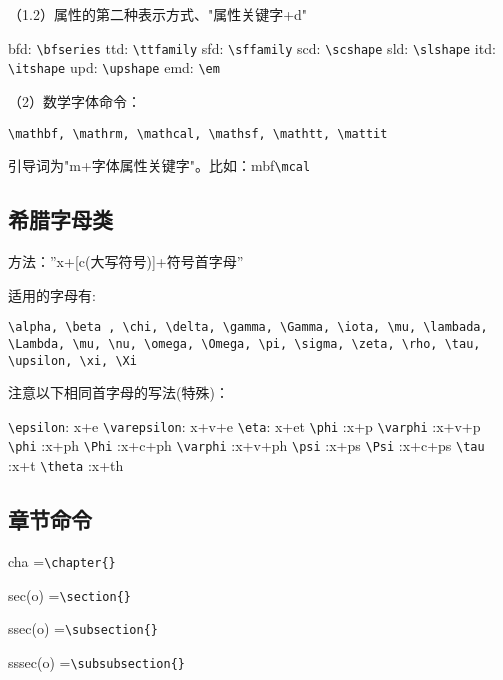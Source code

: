 （1.2）属性的第二种表示方式、"属性关键字+d"

    bfd: \verb|\bfseries|
    ttd: \verb|\ttfamily|
    sfd: \verb|\sffamily|
    scd: \verb|\scshape|
    sld:  \verb|\slshape|
    itd:  \verb|\itshape|
    upd: \verb|\upshape|
    emd: \verb|\em|
 
（2）数学字体命令：
    
  \verb|\mathbf, \mathrm, \mathcal, \mathsf, \mathtt, \mattit|
  
    引导词为"m+字体属性关键字"。比如：mbf\verb|\mcal|
 

 
 \subsection{希腊字母类}
方法：”x+[c(大写符号)]+符号首字母”

适用的字母有:
\begin{verbatim}
\alpha, \beta , \chi, \delta, \gamma, \Gamma, \iota, \mu, \lambada,
\Lambda, \mu, \nu, \omega, \Omega, \pi, \sigma, \zeta, \rho, \tau,
\upsilon, \xi, \Xi
\end{verbatim}

注意以下相同首字母的写法(特殊)：

\verb|\epsilon|: x+e
\verb|\varepsilon|: x+v+e
\verb|\eta|: x+et
\verb|\phi| :x+p
\verb|\varphi| :x+v+p
\verb|\phi| :x+ph
\verb|\Phi| :x+c+ph
\verb|\varphi| :x+v+ph
\verb|\psi| :x+ps
\verb|\Psi| :x+c+ps
\verb|\tau| :x+t
\verb|\theta| :x+th
 
 
 
 \subsection{章节命令}
cha     =\verb|\chapter{}|

sec(o)   =\verb|\section{}|

ssec(o)  =\verb|\subsection{}|

sssec(o) =\verb|\subsubsection{}|

